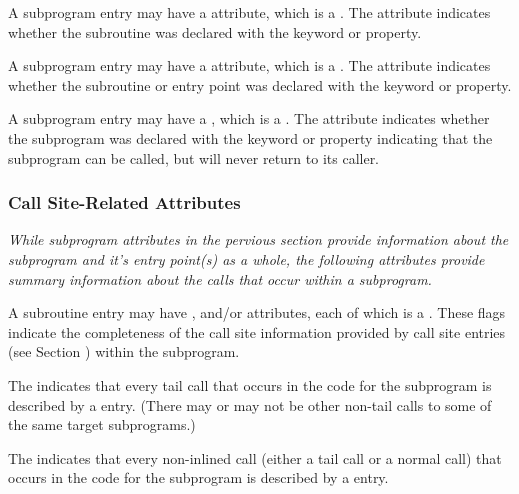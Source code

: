 A 
\hypertarget{chap:DWATpurepurepropertyofasubroutine}{}
subprogram entry may have 
a 
\DWATpureNAME{} attribute, which is
a . 
The attribute indicates whether the subroutine was
declared with the  keyword or property.

A 
\hypertarget{chap:DWATrecursiverecursivepropertyofasubroutine}{}
subprogram entry may have a 
\DWATrecursiveNAME{} attribute, which
is a . 
The attribute indicates whether the subroutine
or entry point was declared with the  keyword
or property.

A subprogram entry may have a 
\DWATnoreturnNAME
{}, 
which is a \CLASSflag. The attribute 
indicates whether the subprogram was declared with the  keyword or property 
indicating that the subprogram can be called, but will never return to its caller.

\subsubsection{Call Site-Related Attributes}
\textit{While subprogram attributes in the pervious section provide
information about the subprogram and it's entry point(s) as a whole,
the following attributes provide summary information about the calls
that occur within a subprogram.}

A subroutine entry may have \DWATcallalltailcalls, \DWATcallallcalls{} 
and/or \DWATcallallsourcecalls{} attributes, each of which is a 
.
These flags indicate the completeness of the call site information 
provided by call site entries (see 
Section ) within the subprogram.

The \DWATcallalltailcallsNAME{}
indicates that every tail call 
that occurs in the code for the subprogram is described by a 
\DWTAGcallsite{} entry. 
(There may or may not be other non-tail calls to some of the same 
target subprograms.)

The \DWATcallallcallsNAME{}
indicates that every non-inlined call
(either a tail call or a normal call) that occurs in the code for the subprogram
is described by a \DWTAGcallsite{} entry.

